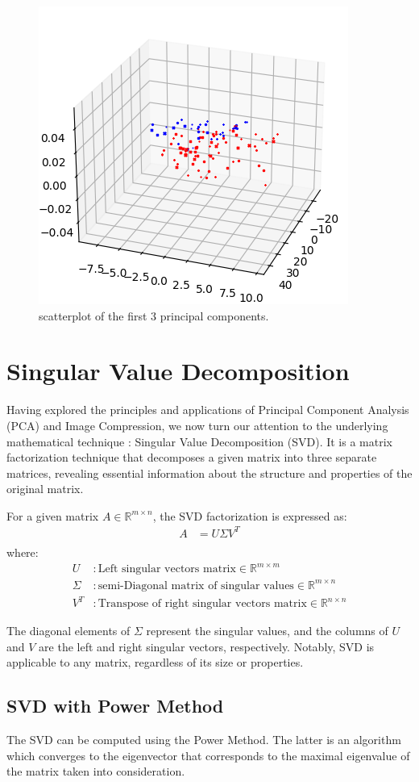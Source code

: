 \documentclass{article}
\begin{document}
\begin{figure}
\centering
\includegraphics[width=0.35\linewidth]{pca_3scatterplot.png}
\caption{\label{pca3}scatterplot of the first 3 principal components.}
\end{figure}




\section{Singular Value Decomposition}
Having explored the principles and applications of Principal Component Analysis (PCA) and Image Compression, we now turn our attention to the underlying mathematical technique : Singular Value Decomposition (SVD). It is a matrix factorization technique that decomposes a given matrix into three separate matrices, revealing essential information about the structure and properties of the original matrix.

For a given matrix $A \in \mathbb{R}^{m \times n}$, the SVD factorization is expressed as:
\begin{align*}
    A & = U \Sigma V^T \\
\end{align*}
where:
\begin{align*}
    U & : \text{Left singular vectors matrix} \in \mathbb{R}^{m \times m} \\
    \Sigma & : \text{semi-Diagonal matrix of singular values} \in \mathbb{R}^{m \times n} \\
    V^T & : \text{Transpose of right singular vectors matrix} \in \mathbb{R}^{n \times n}
\end{align*}

The diagonal elements of $\Sigma$ represent the singular values, and the columns of $U$ and $V$ are the left and right singular vectors, respectively. Notably, SVD is applicable to any matrix, regardless of its size or properties.


\subsection{SVD with Power Method}
The SVD can be computed using the Power Method. The latter is an algorithm which converges to the eigenvector that corresponds to the maximal eigenvalue of the matrix taken into consideration.
\end{document}
